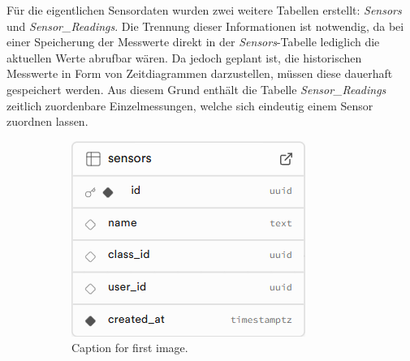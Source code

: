 \begin{inhalt}
Für die eigentlichen Sensordaten wurden zwei weitere Tabellen erstellt: \textit{Sensors} und \textit{Sensor\_Readings}. Die Trennung dieser Informationen ist notwendig, da bei einer Speicherung der Messwerte direkt in der \textit{Sensors}-Tabelle lediglich die aktuellen Werte abrufbar wären. Da jedoch geplant ist, die historischen Messwerte in Form von Zeitdiagrammen darzustellen, müssen diese dauerhaft gespeichert werden. Aus diesem Grund enthält die Tabelle \textit{Sensor\_Readings} zeitlich zuordenbare Einzelmessungen, welche sich eindeutig einem Sensor zuordnen lassen.

\begin{figure}[!htb]
  \centering
  \begin{subfigure}[b]{0.45\textwidth}
    \centering
    \includegraphics[width=\textwidth]{files/Thomas/pics/Datenbank_Design/sensors.png}
    \caption{Caption for first image.}
    \label{fig:school1}
  \end{subfigure}
  \hfill
  \begin{subfigure}[b]{0.45\textwidth}
    \centering

\end{subfigure}
\end{figure}
\end{inhalt}
